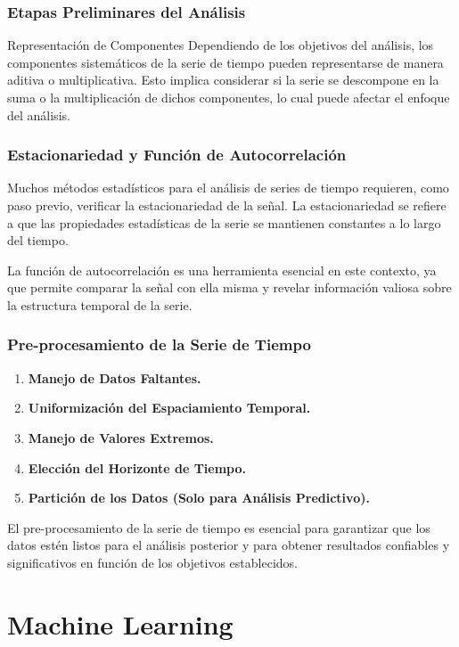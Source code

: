 \documentclass{beamer}
\begin{document}
  \begin{frame}
	\frametitle{Etapas Preliminares del Análisis}
	\begin{block}{Representación de Componentes}
		Dependiendo de los objetivos del análisis, los componentes sistemáticos de la serie de tiempo pueden representarse de manera aditiva o multiplicativa. Esto implica considerar si la serie se descompone en la suma o la multiplicación de dichos componentes, lo cual puede afectar el enfoque del análisis.
	\end{block}
  \end{frame}
  
  \begin{frame}
	\frametitle{Estacionariedad y Función de Autocorrelación}
	Muchos métodos estadísticos para el análisis de series de tiempo requieren, como paso previo, verificar la estacionariedad de la señal. La estacionariedad se refiere a que las propiedades estadísticas de la serie se mantienen constantes a lo largo del tiempo.
	
	La función de autocorrelación es una herramienta esencial en este contexto, ya que permite comparar la señal con ella misma y revelar información valiosa sobre la estructura temporal de la serie.
  \end{frame}
  
  \begin{frame}
	\frametitle{Pre-procesamiento de la Serie de Tiempo}
	\begin{enumerate}
	  \item \textbf{Manejo de Datos Faltantes.} 
	  \item \textbf{Uniformización del Espaciamiento Temporal.}
	  \item \textbf{Manejo de Valores Extremos.}
	  \item \textbf{Elección del Horizonte de Tiempo.}
	  \item \textbf{Partición de los Datos (Solo para Análisis Predictivo).}
	\end{enumerate}
	El pre-procesamiento de la serie de tiempo es esencial para garantizar que los datos estén listos para el análisis posterior y para obtener resultados confiables y significativos en función de los objetivos establecidos.
  \end{frame}
  


\section{Machine Learning}
	
\end{document}

